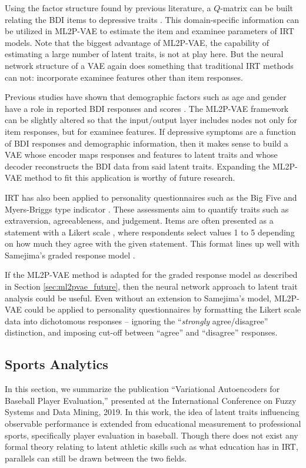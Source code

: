 Using the factor structure found by previous literature, a $Q$-matrix can be built relating the BDI items to depressive traits \cite{fragoso2013}. This domain-specific information can be utilized in ML2P-VAE to estimate the item and examinee parameters of IRT models. Note that the biggest advantage of ML2P-VAE, the capability of estimating a large number of latent traits, is not at play here. But the neural network structure of a VAE again does something that traditional IRT methods can not: incorporate examinee features other than item responses.

Previous studies have shown that demographic factors such as age and gender have a role in reported BDI responses and scores \cite{de2019}. The ML2P-VAE framework can be slightly altered so that the input/output layer includes nodes not only for item responses, but for examinee features. If depressive symptoms are a function of BDI responses and demographic information, then it makes sense to build a VAE whose encoder maps responses and features to latent traits and whose decoder reconstructs the BDI data from said latent traits. Expanding the ML2P-VAE method to fit this application is worthy of future research.

IRT has also been applied to personality questionnaires such as the Big Five and Myers-Briggs type indicator \cite{myers1962, robie2001}. These assessments aim to quantify traits such as extraversion, agreeableness, and judgement. Items are often presented as a statement with a Likert scale \cite{likert1932}, where respondents select values 1 to 5 depending on how much they agree with the given statement. This format lines up well with Samejima's graded response model \cite{samejima1997}. 

If the ML2P-VAE method is adapted for the graded response model as described in Section \ref{sec:ml2pvae_future}, then the neural network approach to latent trait analysis could be useful. Even without an extension to Samejima's model, ML2P-VAE could be applied to personality questionnaires by formatting the Likert scale data into dichotomous responses -- ignoring the ``\textit{strongly} agree/disagree'' distinction, and imposing  cut-off between ``agree'' and ``disagree'' responses.

\subsection{Sports Analytics}
In this section, we summarize the publication ``Variational Autoencoders for Baseball Player Evaluation,'' \cite{fsdm_paper} presented at the International Conference on Fuzzy Systems and Data Mining, 2019. In this work, the idea of latent traits influencing observable performance is extended from educational measurement to professional sports, specifically player evaluation in baseball. Though there does not exist any formal theory relating to latent athletic skills such as what education has in IRT, parallels can still be drawn between the two fields.

